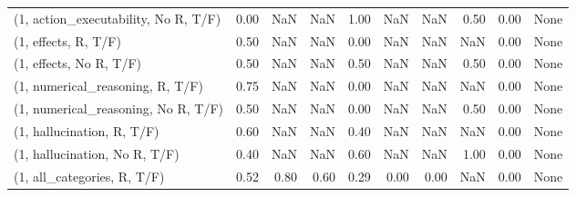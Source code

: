 \begin{table*}[h!]
\begin{adjustbox}{width=2\columnwidth,center}
\begin{tabular}{lrrr|rrr|rrr}
(1, action\_executability, No R, T/F) &                      0.00 &                   NaN &                       NaN &                          1.00 &                       NaN &                           NaN &                                   0.50 &                               0.00 &                                  None \\
(1, effects, R, T/F)                 &                      0.50 &                   NaN &                       NaN &                          0.00 &                       NaN &                           NaN &                                    NaN &                               0.00 &                                  None \\
(1, effects, No R, T/F)              &                      0.50 &                   NaN &                       NaN &                          0.50 &                       NaN &                           NaN &                                   0.50 &                               0.00 &                                  None \\
(1, numerical\_reasoning, R, T/F)     &                      0.75 &                   NaN &                       NaN &                          0.00 &                       NaN &                           NaN &                                    NaN &                               0.00 &                                  None \\
(1, numerical\_reasoning, No R, T/F)  &                      0.50 &                   NaN &                       NaN &                          0.00 &                       NaN &                           NaN &                                   0.50 &                               0.00 &                                  None \\
(1, hallucination, R, T/F)           &                      0.60 &                   NaN &                       NaN &                          0.40 &                       NaN &                           NaN &                                    NaN &                               0.00 &                                  None \\
(1, hallucination, No R, T/F)        &                      0.40 &                   NaN &                       NaN &                          0.60 &                       NaN &                           NaN &                                   1.00 &                               0.00 &                                  None \\
(1, all\_categories, R, T/F)          &                      0.52 &                  0.80 &                      0.60 &                          0.29 &                      0.00 &                          0.00 &                                    NaN &                               0.00 &                                  None \\

\end{tabular}
\end{adjustbox}
\end{table*}
